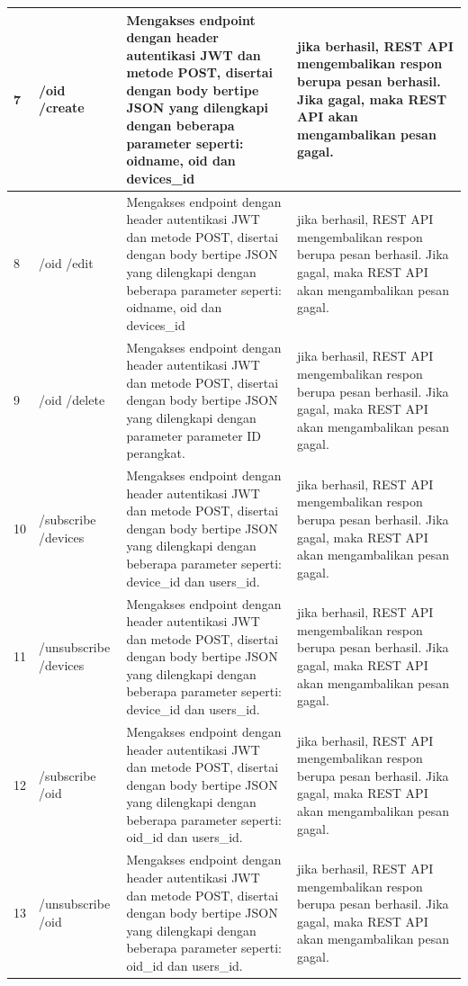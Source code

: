 \begin{longtable}{|p{}|p{}|p{}|p{}|}
            	7 & /oid /create & Mengakses endpoint dengan header autentikasi JWT dan metode POST, disertai dengan body bertipe JSON yang dilengkapi dengan beberapa parameter seperti: oidname, oid dan devices\_id & jika berhasil, REST API mengembalikan respon berupa pesan berhasil. Jika gagal, maka REST API akan mengambalikan pesan gagal. \\ \hline
            	8 & /oid /edit & Mengakses endpoint dengan header autentikasi JWT dan metode POST, disertai dengan body bertipe JSON yang dilengkapi dengan beberapa parameter seperti: oidname, oid dan devices\_id & jika berhasil, REST API mengembalikan respon berupa pesan berhasil. Jika gagal, maka REST API akan mengambalikan pesan gagal. \\ \hline
            	9 & /oid /delete & Mengakses endpoint dengan header autentikasi JWT dan metode POST, disertai dengan body bertipe JSON yang dilengkapi dengan parameter parameter ID perangkat. & jika berhasil, REST API mengembalikan respon berupa pesan berhasil. Jika gagal, maka REST API akan mengambalikan pesan gagal. \\ \hline
            	10 & /subscribe /devices & Mengakses endpoint dengan header autentikasi JWT dan metode POST, disertai dengan body bertipe JSON yang dilengkapi dengan beberapa parameter seperti: device\_id dan users\_id. & jika berhasil, REST API mengembalikan respon berupa pesan berhasil. Jika gagal, maka REST API akan mengambalikan pesan gagal. \\ \hline
            	11 & /unsubscribe /devices & Mengakses endpoint dengan header autentikasi JWT dan metode POST, disertai dengan body bertipe JSON yang dilengkapi dengan beberapa parameter seperti: device\_id dan users\_id. & jika berhasil, REST API mengembalikan respon berupa pesan berhasil. Jika gagal, maka REST API akan mengambalikan pesan gagal. \\ \hline
            	12 & /subscribe /oid & Mengakses endpoint dengan header autentikasi JWT dan metode POST, disertai dengan body bertipe JSON yang dilengkapi dengan beberapa parameter seperti: oid\_id dan users\_id. & jika berhasil, REST API mengembalikan respon berupa pesan berhasil. Jika gagal, maka REST API akan mengambalikan pesan gagal. \\ \hline
            	13 & /unsubscribe /oid & Mengakses endpoint dengan header autentikasi JWT dan metode POST, disertai dengan body bertipe JSON yang dilengkapi dengan beberapa parameter seperti: oid\_id dan users\_id. & jika berhasil, REST API mengembalikan respon berupa pesan berhasil. Jika gagal, maka REST API akan mengambalikan pesan gagal. \\ \hline
            \end{longtable}
            
